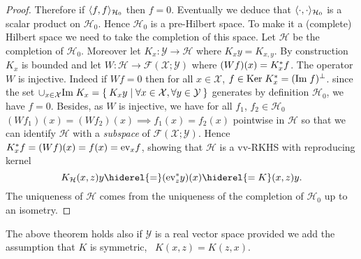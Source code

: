 \begin{proof}
Therefore if $\langle f,f\rangle_{\mathcal{H}_0}$ then $f=0$. Eventually we deduce that $\langle\cdot,\cdot\rangle_{\mathcal{H}_0}$ is a scalar product on $\mathcal{H}_0$. Hence $\mathcal{H}_0$ is a pre-Hilbert space. To make it a (complete) Hilbert space we need to take the completion of this space. Let $\mathcal{H}$ be the completion of $\mathcal{H}_0$. Moreover let $K_x:\mathcal{Y}\to\mathcal{H}$ where $K_xy=K_{x,y}$. By construction $K_x$ is bounded and let $W:\mathcal{H}\to\mathcal{F}(\mathcal{X};\mathcal{Y})$ where $(Wf)(x)=K_x^* f$. The operator $W$ is injective. Indeed if $Wf=0$ then for all $x\in\mathcal{X}$, $f\in\text{Ker}\; K_x^*=(\text{Im}\; f)^{\perp}$. since the set $\cup_{x\in\mathcal{X}}\text{Im}\; K_x=\Set{K_xy|\forall x\in\mathcal{X}, \forall y\in\mathcal{Y}}$ generates by definition $\mathcal{H}_0$, we have $f=0$. Besides, as $W$ is injective, we have for all $f_1$, $f_2\in\mathcal{H}_0$ $(Wf_1)(x)=(Wf_2)(x){\scriptstyle\implies} f_1(x)=f_2(x)$ pointwise in $\mathcal{H}$ so that we can identify $\mathcal{H}$ with a \emph{subspace} of $\mathcal{F}(\mathcal{X};\mathcal{Y})$. Hence $K_x^* f=(Wf)(x)=f(x)=\text{ev}_xf$, showing that $\mathcal{H}$ is a \acl{vv-RKHS} with reproducing kernel
\begin{dmath*}
K_{\mathcal{H}}(x,z)y\hiderel{=}(\text{ev}^\adjoint_zy)(x)\hiderel{=K}(x,z)y.
\end{dmath*}
The uniqueness of $\mathcal{H}$ comes from the uniqueness of the completion of $\mathcal{H}_0$ up to an isometry.
\end{proof}
The above theorem holds also if $\mathcal{Y}$ is a real vector space provided we add the assumption that $K$ is symmetric, \ie~$K(x,z)=K(z,x)$.
